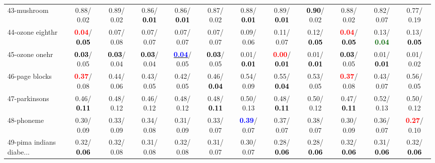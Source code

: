 \begin{table}[h]
\begin{center}
{\begin{tabular}{lc|c|c|c|c|c|c|c|c|c|c}
43-mushroom &   0.88/  0.02 &   0.89/  0.02 &   0.86/\textcolor{black}{\textbf{  0.01}} &   0.86/\textcolor{black}{\textbf{  0.01}} &   0.87/  0.02 &   0.88/\textcolor{black}{\textbf{  0.01}} &   0.89/\textcolor{black}{\textbf{  0.01}} & \textcolor{black}{\textbf{  0.90}}/  0.02 &   0.88/  0.02 &   0.82/  0.07 &   0.77/  0.19 \\
44-ozone eighthr & \textcolor{red}{\textbf{  0.04}}/\textcolor{black}{\textbf{  0.05}} &   0.07/  0.08 &   0.07/  0.07 &   0.07/  0.07 &   0.07/  0.07 &   0.09/  0.06 &   0.11/  0.07 &   0.12/\textcolor{black}{\textbf{  0.05}} & \textcolor{red}{\textbf{  0.04}}/\textcolor{black}{\textbf{  0.05}} &   0.13/\textcolor{darkgreen}{\textbf{  0.04}} &   0.13/\textcolor{black}{\textbf{  0.05}} \\
45-ozone onehr & \textcolor{black}{\textbf{  0.03}}/  0.05 & \textcolor{black}{\textbf{  0.03}}/  0.04 & \textcolor{black}{\textbf{  0.03}}/  0.04 & \underline{\textcolor{blue}{\textbf{  0.04}}}/  0.05 & \textcolor{black}{\textbf{  0.03}}/  0.05 &   0.01/\textcolor{black}{\textbf{  0.01}} & \textcolor{red}{\textbf{  0.00}}/\textcolor{black}{\textbf{  0.01}} &   0.01/\textcolor{black}{\textbf{  0.01}} & \textcolor{black}{\textbf{  0.03}}/  0.05 &   0.01/\textcolor{black}{\textbf{  0.01}} &   0.01/  0.02 \\
46-page blocks & \textcolor{red}{\textbf{  0.37}}/  0.08 &   0.44/  0.06 &   0.43/  0.05 &   0.42/  0.05 &   0.46/\textcolor{black}{\textbf{  0.04}} &   0.54/  0.09 &   0.55/\textcolor{black}{\textbf{  0.04}} &   0.53/  0.05 & \textcolor{red}{\textbf{  0.37}}/  0.08 &   0.43/  0.07 &   0.56/  0.05 \\ \hline
47-parkinsons &   0.46/\textcolor{black}{\textbf{  0.11}} &   0.48/  0.12 &   0.46/  0.12 &   0.48/  0.12 &   0.48/\textcolor{black}{\textbf{  0.11}} &   0.50/  0.13 &   0.48/\textcolor{black}{\textbf{  0.11}} &   0.50/  0.12 &   0.47/\textcolor{black}{\textbf{  0.11}} &   0.52/  0.13 &   0.50/  0.12 \\
48-phoneme &   0.30/  0.09 &   0.33/  0.09 &   0.34/  0.08 &   0.31/  0.09 &   0.33/  0.07 & \textcolor{blue}{\textbf{  0.39}}/  0.07 &   0.37/  0.07 &   0.38/  0.07 &   0.30/  0.09 &   0.36/  0.07 & \textcolor{red}{\textbf{  0.27}}/  0.10 \\
49-pima indians diabe... &   0.32/\textcolor{black}{\textbf{  0.06}} &   0.32/  0.08 &   0.31/  0.08 &   0.32/  0.08 &   0.31/  0.07 &   0.30/  0.07 &   0.28/\textcolor{black}{\textbf{  0.06}} &   0.28/\textcolor{black}{\textbf{  0.06}} &   0.32/\textcolor{black}{\textbf{  0.06}} &   0.31/\textcolor{black}{\textbf{  0.06}} &   0.32/\textcolor{black}{\textbf{  0.06}} \\

\end{tabular}}
\end{center}
\end{table}
